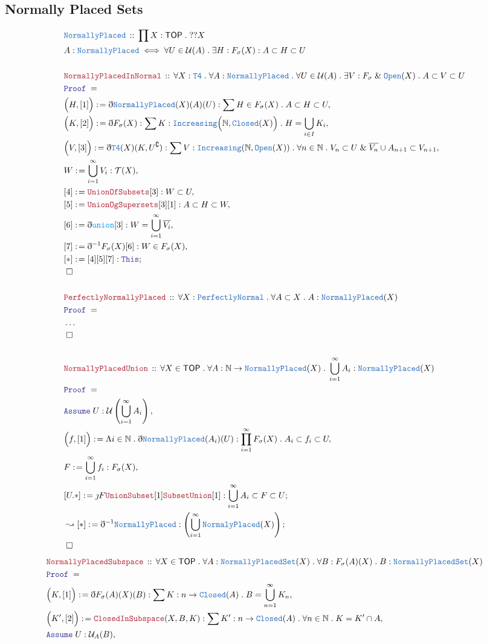\documentclass[12pt]{scrartcl}
\newcommand{\TYPE}[1]{\textcolor{NavyBlue}{\mathtt{#1}}}
\newcommand{\FUNC}[1]{\textcolor{Cerulean}{\mathtt{#1}}}
\newcommand{\LOGIC}[1]{\textcolor{Blue}{\mathtt{#1}}}
\newcommand{\THM}[1]{\textcolor{Maroon}{\mathtt{#1}}}
\renewcommand{\.}{\; . \;}
\newcommand{\de}{: \kern 0.1pc =}
\newcommand{\Act}[1]{\left( #1 \right)}
\newcommand{\Theorem}[2]{& \THM{#1} \, :: \, #2 \\ & \Proof = \\ }
\newcommand{\DeclareType}[2]{& \TYPE{#1} \, :: \, #2 \\}
\newcommand{\DefineType}[3]{& #1 : \TYPE{#2} \iff #3 \\}
\newcommand{\Page}[1]{ \begin{align*} #1 \end{align*}   }
\newcommand{ \bd }{ \ByDef }
\newcommand{\NoProof}{ & \ldots \\ \EndProof}
\renewcommand{\And}{\; \& \;}
\newcommand{\Nat}{\mathbb{N} }
\renewcommand{\c}{\complement}
\newcommand{\Say}[3]{& #1 \de #2 : #3, \\}
\newcommand{\Conclude}[3]{& #1 \de #2 : #3; \\}
\newcommand{\DeriveConclude}[3]{& \leadsto #1 \de #2 : #3 ; \\}
\newcommand{\Assume}[2]{& \LOGIC{Assume} \; #1 : #2, \\}
\newcommand{\QED}{\; \square}
\newcommand{\EndProof}{& \QED \\}
\newcommand{\ByDef}{\eth}
\newcommand{\ByConstr}{\jmath}
\newcommand{\Proof}{\LOGIC{Proof} \; }
\newcommand{\PN}{\TYPE{PerfectlyNormal}}
\newcommand{\TOP}{\mathsf{TOP}}
\newcommand{\T}{\mathcal{T}}
\newcommand{\U}{\mathcal{U}}
\begin{document}
\subsection{Normally Placed Sets}
\Page{
	\DeclareType{NormallyPlaced}{\prod X : \TOP \. ??X}
	\DefineType{A}{NormallyPlaced}
	{
		\forall U \in \U(A) \.
		\exists H : F_\sigma(X) :
		A \subset H \subset U
	}
	\\
	\Theorem{NormallyPlacedInNormal}
	{
		\forall X : \TYPE{T4} \.
		\forall A : \TYPE{NormallyPlaced} \.
		\forall U \in \U(A) \.
		\exists V : F_\sigma \And \TYPE{Open}(X) \.
		A \subset V \subset U
	}
	\Say{\Big(H,[1]\Big)}{\bd \TYPE{NormallyPlaced}(X)(A)(U)}
	{ \sum H \in F_\sigma(X) \. A \subset H \subset U}
	\Say{\Big(K,[2] \Big)}{ \bd F_\sigma(X)}
	{
		\sum K : \TYPE{Increasing}\Big(\Nat, \TYPE{Closed}(X)\Big) 
		\.
		H = \bigcup_{i \in I} K_i
	}
	\Say{\Big(V,[3]\Big)}{ \bd \TYPE{T4}(X)(K, U^\c)   }
	{ 
		\sum  V : \TYPE{Increasing}(\Nat, \TYPE{Open}(X))  \.    
		\forall n \in \Nat \.   V_n \subset U \And  \overline{V_n} \cup A_{n+1} \subset V_{n+1}
	}
	\Say{W}{\bigcup^\infty_{i=1} V_i}{\T(X)}
	\Say{[4]}{\THM{UnionOfSubsets}[3]}{W \subset U}
	\Say{[5]}{\THM{UnionOgSupersets}[3][1]}{A \subset H \subset W}
	\Say{[6]}{\bd \FUNC{union}[3]}{ W = \bigcup^\infty_{i=1} \overline{V_i}  }
	\Say{[7]}{\bd^{-1} F_\sigma(X)[6]}{ W \in F_\sigma(X) }
	\Conclude{[*]}{[4][5][7]}{ \LOGIC{This}  }
	\EndProof
	\\
	\Theorem{PerfectlyNormallyPlaced}
	{
		\forall X : \PN \.
		\forall A \subset X \.
		A : \TYPE{NormallyPlaced}(X)
	}
	\NoProof
	\\
	\Theorem{NormallyPlacedUnion}
	{
		\forall X \in \TOP \.
		\forall A : \Nat \to \TYPE{NormallyPlaced}(X) \.
		\bigcup^\infty_{i=1} A_i : \TYPE{NormallyPlaced}(X)
	}
	\Assume{U}{\U\Act{\bigcup^\infty_{i=1} A_i}}
	\Say{\Big(f,[1]\Big)}{\Lambda i \in \Nat \. \bd \TYPE{NormallyPlaced}(A_i)(U) }
	{
		\prod^\infty_{i=1} F_\sigma(X) \. A_i \subset  f_i \subset U
	}
	\Say{F}{\bigcup^\infty_{i=1} f_i}{F_\sigma(X)}
	\Conclude{[U.*]}{\ByConstr F \THM{UnionSubset}[1]\THM{SubsetUnion}[1]}
	{
		\bigcup^\infty_{i=1} A_i \subset F \subset U
	}
	\DeriveConclude{[*]}{\bd^{-1} \TYPE{NormallyPlaced}}{\Act{\bigcup^\infty_{i=1} \TYPE{NormalyPlaced}(X)} }
	\EndProof
}\Page{
	\Theorem{NormallyPlacedSubspace}
	{
		\forall X \in \TOP \.
		\forall A : \TYPE{NormallyPlacedSet}(X) \.
		\forall B : F_\sigma(A)(X) \.
		B : \TYPE{NormallyPlacedSet}(X) 
	}
	\Say{\Big( K, [1] \Big)}{\bd F_\sigma(A)(X)(B)}{\sum K : n \to \TYPE{Closed}(A) \. B = \bigcup^\infty_{n=1} K_n}
	\Say{\Big(K',[2]\Big)}{\THM{ClosedInSubspace}(X,B,K)}{
		\sum K' : n \to \TYPE{Closed}(A) \. 
		\forall n \in \Nat \. K = K' \cap A 
	}
	\Assume{U}{\U_A(B)}
}
\newpage
\end{document}
